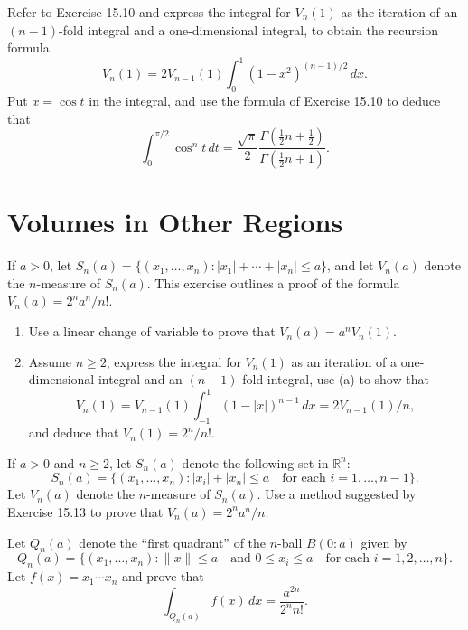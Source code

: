 \begin{problembox}
Refer to Exercise 15.10 and express the integral for \( V_n(1) \) as the iteration of an \( (n - 1) \)-fold integral and a one-dimensional integral, to obtain the recursion formula
\[
V_n(1) = 2V_{n-1}(1) \int_0^1 (1 - x^2)^{(n-1)/2} \, dx.
\]
Put \( x = \cos t \) in the integral, and use the formula of Exercise 15.10 to deduce that
\[
\int_0^{\pi/2} \cos^n t \, dt = \frac{\sqrt{\pi}}{2} \frac{\Gamma(\frac{1}{2}n + \frac{1}{2})}{\Gamma(\frac{1}{2}n + 1)}.
\]
\end{problembox}

\section{Volumes in Other Regions}

\begin{problembox}
If \( a > 0 \), let \( S_n(a) = \{(x_1, \ldots, x_n): |x_1| + \cdots + |x_n| \leq a\} \), and let \( V_n(a) \) denote the \( n \)-measure of \( S_n(a) \). This exercise outlines a proof of the formula \( V_n(a) = 2^n a^n / n! \).
\begin{enumerate}[label=(\alph*)]
\item Use a linear change of variable to prove that \( V_n(a) = a^n V_n(1) \).
\item Assume \( n \geq 2 \), express the integral for \( V_n(1) \) as an iteration of a one-dimensional integral and an \( (n - 1) \)-fold integral, use (a) to show that
\[
V_n(1) = V_{n-1}(1) \int_{-1}^1 (1 - |x|)^{n-1} \, dx = 2V_{n-1}(1)/n,
\]
and deduce that \( V_n(1) = 2^n / n! \).
\end{enumerate}
\end{problembox}

\begin{problembox}
If \( a > 0 \) and \( n \geq 2 \), let \( S_n(a) \) denote the following set in \( \mathbb{R}^n \):
\[
S_n(a) = \{(x_1, \ldots, x_n): |x_i| + |x_n| \leq a \quad \text{for each } i = 1, \ldots, n - 1\}.
\]
Let \( V_n(a) \) denote the \( n \)-measure of \( S_n(a) \). Use a method suggested by Exercise 15.13 to prove that \( V_n(a) = 2^n a^n / n \).
\end{problembox}

\begin{problembox}
Let \( Q_n(a) \) denote the ``first quadrant'' of the \( n \)-ball \( B(0:a) \) given by
\[
Q_n(a) = \{(x_1, \ldots, x_n): \|x\| \leq a \quad \text{and } 0 \leq x_i \leq a \quad \text{for each } i = 1, 2, \ldots, n\}.
\]
Let \( f(x) = x_1 \cdots x_n \) and prove that
\[
\int_{Q_n(a)} f(x) \, dx = \frac{a^{2n}}{2^n n!}.
\]
\end{problembox}